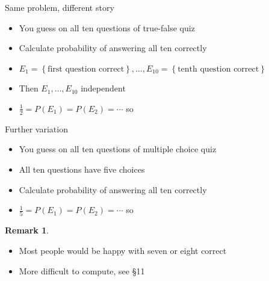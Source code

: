 \documentclass[handout]{beamer}
\theoremstyle{definition}
\newtheorem{remark}{Remark}
\begin{document}
\begin{frame}{Same problem, different story}
\begin{itemize}
\item You guess on all ten questions of true-false quiz
\item Calculate probability of answering all ten correctly
\item $E_1=\left\{\text{first question correct}\right\},\ldots,
E_{10}=\left\{\text{tenth question correct}\right\}$
\item Then $E_1,\ldots,E_{10}$ independent
\item $\frac{1}{2}=P\left(E_1\right)=P\left(E_2\right)=\cdots$ so
\end{itemize}
\end{frame}

\begin{frame}{Further variation}
\begin{itemize}
\item You guess on all ten questions of multiple choice quiz
\item All ten questions have five choices
\item Calculate probability of answering all ten correctly
\item $\frac{1}{5}=P\left(E_1\right)=P\left(E_2\right)=\cdots$ so
\end{itemize}
\begin{remark}
\begin{itemize}
\item Most people would be happy with seven or eight correct
\item More difficult to compute, see \S11
\end{itemize}
\end{remark}
\end{frame}
\end{document}
